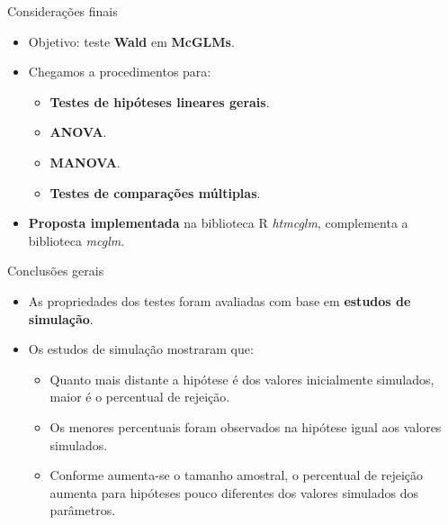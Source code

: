 \documentclass[
  ignorenonframetext,
  serif,
  professionalfont,
  usenames,
  dvipsnames,
  aspectratio = 169]{beamer}
\begin{document}
\begin{frame}{Considerações finais}
\protect\hypertarget{considerauxe7uxf5es-finais-1}{}
\begin{itemize}
  \itemsep 2ex
  
  \item Objetivo: teste \textbf{Wald} em \textbf{McGLMs}. 
  \item Chegamos a procedimentos para:
  \begin{itemize}
    \item \textbf{Testes de hipóteses lineares gerais}.
    \item \textbf{ANOVA}.
    \item \textbf{MANOVA}.
    \item \textbf{Testes de comparações múltiplas}. 
  \end{itemize}
  
  \item \textbf{Proposta implementada} na biblioteca R \emph{htmcglm}, complementa a biblioteca \emph{mcglm}.

\end{itemize}
\end{frame}

\begin{frame}{Conclusões gerais}
\protect\hypertarget{conclusuxf5es-gerais}{}
\begin{itemize}
  \itemsep 2ex
  
  \item As propriedades dos testes foram avaliadas com base em \textbf{estudos de simulação}.

  \item Os estudos de simulação mostraram que:

  \begin{itemize}
    \itemsep 2ex
      \item Quanto mais distante a hipótese é dos valores inicialmente simulados, maior é o percentual de rejeição. 
      \item Os menores percentuais foram observados na hipótese igual aos valores simulados.
      \item Conforme aumenta-se o tamanho amostral, o percentual de rejeição aumenta para hipóteses pouco diferentes dos valores simulados dos parâmetros.
  \end{itemize}
\end{itemize}
\end{frame}
\end{document}
